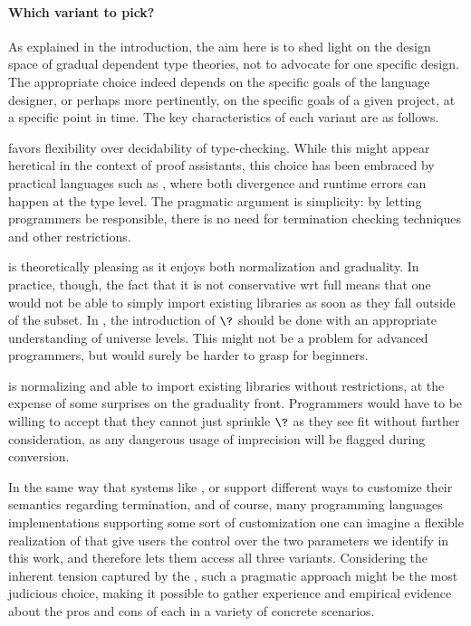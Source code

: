 \paragraph{Which variant to pick?}
As explained in the introduction, the aim here is to shed light on the design space of gradual
dependent type theories, not to advocate for one specific design.
%
The appropriate choice indeed depends on the specific goals of the language designer,
or perhaps more pertinently, on the specific goals of a given project,
at a specific point in time.
The key characteristics of each variant are as follows.

 favors flexibility over decidability of type-checking. While this might appear
heretical in the context of proof assistants, this choice has been embraced by practical languages such as  ,
where both divergence and runtime errors can happen at the type
level. The pragmatic argument is simplicity: by letting programmers be responsible,
there is no need for termination checking techniques and other restrictions.

 is theoretically pleasing as it enjoys both normalization and graduality.
In practice, though, the fact that it is not conservative wrt full  means that one would
not be able to simply import existing libraries as soon as they
fall outside of the  subset.
In , the introduction of $\?$ should be done with an appropriate understanding of
universe levels. This might not be a problem for advanced programmers,
but would surely be harder to grasp for beginners.

 is normalizing and able to import existing libraries without restrictions,
at the expense of some surprises on the graduality front.
Programmers would have to be willing to accept that they cannot just sprinkle $\?$
as they see fit without further consideration,
as any dangerous usage of imprecision will be flagged during conversion.

In the same way that systems like ,  or  support
different ways to customize their semantics regarding termination,%
and of course, many programming languages implementations supporting some sort of customization%
one can imagine a flexible realization of  that give users the control over the two
parameters we identify in this work, and therefore lets them access all three  variants.
%
Considering the inherent tension captured by the ,
such a pragmatic approach might be the most judicious choice,
making it possible to gather experience and empirical evidence about
the pros and cons of each in a variety of concrete scenarios.

